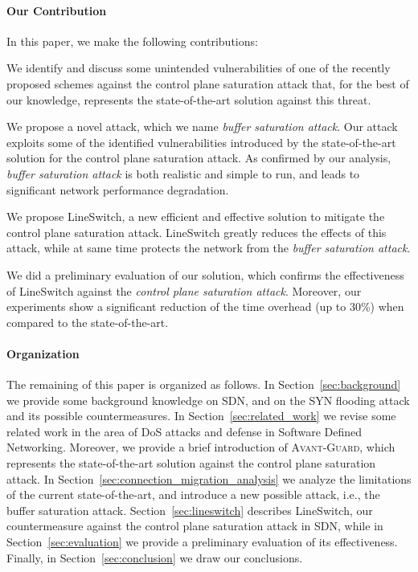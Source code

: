\documentclass{sig-alternate}
\newcommand{\avantguard}{\textsc{Avant-Guard}}
\begin{document}
\paragraph*{Our Contribution} In this paper, we make the following contributions:
\begin{compactitem}

	\item We identify and discuss some unintended vulnerabilities of one of the recently 
	proposed schemes against the control plane saturation attack that, for the best of our knowledge, 
	represents the state-of-the-art solution against this threat.
	
	\item We propose a novel attack, which we name {\em buffer saturation attack}.
	Our attack exploits some of the identified vulnerabilities introduced by the state-of-the-art solution
	for the control plane saturation attack. 
	As confirmed by our analysis, {\em buffer saturation attack} is both realistic and simple to run, 
	and leads to significant network performance degradation.

	\item We propose LineSwitch, 
	a new efficient and effective solution to mitigate the control 
	plane saturation attack. LineSwitch greatly reduces the effects of this 
	attack, while at same time protects the network from the {\em buffer saturation attack}.
	
	\item We did a preliminary evaluation of our solution, which confirms the effectiveness of LineSwitch against
	the {\em control plane saturation attack}. Moreover, our experiments show a significant reduction of the time 
	overhead (up to 30\%) when compared to the state-of-the-art.

\end{compactitem}

\paragraph*{Organization}
The remaining of this paper is organized as follows. In Section~\ref{sec:background} we provide some background knowledge on SDN, and on the SYN flooding attack and its possible countermeasures. 
In Section~\ref{sec:related_work} we revise some related work in the area of DoS attacks and defense in Software Defined Networking. 
Moreover, we provide a brief introduction of \avantguard, which represents the state-of-the-art solution against the control plane saturation attack. 
In Section~\ref{sec:connection_migration_analysis} we analyze the limitations of the current state-of-the-art, 
and introduce a new possible attack, i.e., the buffer saturation attack. 
Section~\ref{sec:lineswitch} describes LineSwitch, our countermeasure against the control plane saturation attack in SDN, 
while in Section~\ref{sec:evaluation} we provide a preliminary evaluation of its effectiveness. 
Finally, in Section~\ref{sec:conclusion} we draw our conclusions. 
\end{document}
